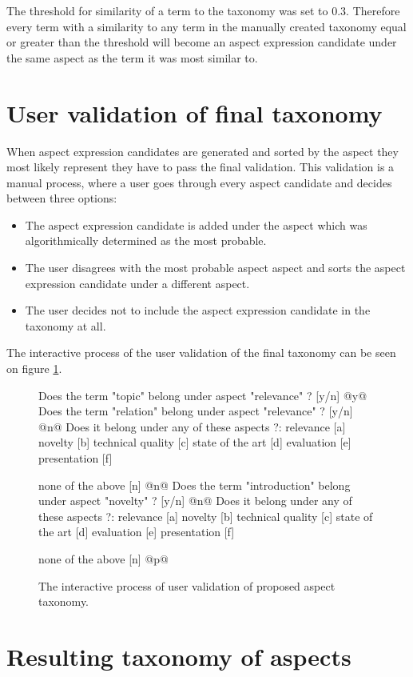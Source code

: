 The threshold for similarity of a term to the taxonomy was set to 0.3. Therefore every term with a similarity to any term in the manually created taxonomy equal or greater than the threshold will become an aspect expression candidate under the same aspect as the term it was most similar to.
\section{User validation of final taxonomy}
\label{sec:user_val}
When aspect expression candidates are generated and sorted by the aspect they most likely represent they have to pass the final validation. This validation is a manual process, where a user goes through every aspect candidate and decides between three options:
\begin{itemize}
\item The aspect expression candidate is added under the aspect which was algorithmically determined as the most probable.
\item The user disagrees with the most probable aspect aspect and sorts the aspect expression candidate under a different aspect.
\item The user decides not to include the aspect expression candidate in the taxonomy at all.
\end{itemize}

The interactive process of the user validation of the final taxonomy can be seen on figure \ref{img:user_tax}.
\begin{figure}[htbp!]

\begin{commandshell}
Does the term "topic" belong under aspect "relevance" ? [y/n]
@y@
Does the term "relation" belong under aspect "relevance" ? [y/n]
@n@
Does it belong under any of these aspects ?:
relevance                [a]
novelty                  [b]
technical quality        [c]
state of the art         [d]
evaluation               [e]
presentation             [f]

none of the above        [n]
@n@
Does the term "introduction" belong under aspect "novelty" ? [y/n]
@n@
Does it belong under any of these aspects ?:
relevance                [a]
novelty                  [b]
technical quality        [c]
state of the art         [d]
evaluation               [e]
presentation             [f]

none of the above        [n]
@p@
\end{commandshell}
\caption{The interactive process of user validation of proposed aspect taxonomy.}
\label{img:user_tax}
\end{figure}
\section{Resulting taxonomy of aspects}
